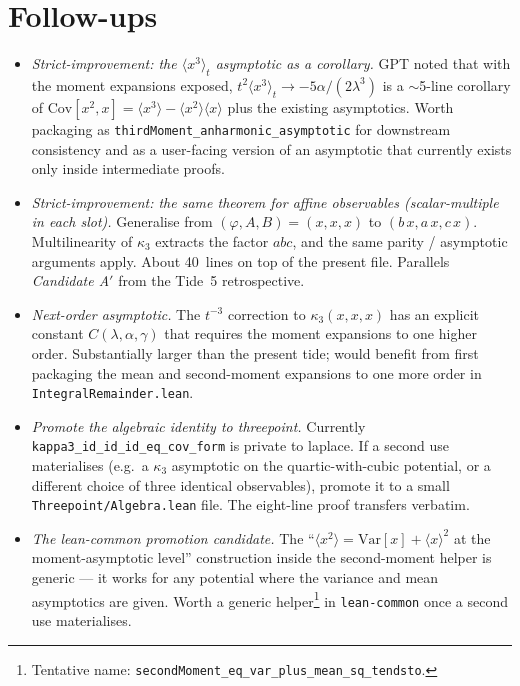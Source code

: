 \documentclass[11pt]{article}
\begin{document}
\section{Follow-ups}

\begin{itemize}
\item \emph{Strict-improvement: the $\langle x^3 \rangle_t$ asymptotic
as a corollary.} GPT noted that with the moment expansions exposed,
$t^2 \langle x^3 \rangle_t \to -5\alpha/(2\lambda^3)$ is a $\sim$5-line
corollary of $\mathrm{Cov}[x^2, x] = \langle x^3 \rangle - \langle x^2 \rangle \langle x \rangle$
plus the existing asymptotics. Worth packaging as
\texttt{thirdMoment\_anharmonic\_asymptotic} for downstream consistency
and as a user-facing version of an asymptotic that currently exists
only inside intermediate proofs.

\item \emph{Strict-improvement: the same theorem for affine observables
(scalar-multiple in each slot).} Generalise from $(\varphi, A, B) = (x, x, x)$
to $(b\,x, a\,x, c\,x)$. Multilinearity of $\kappa_3$ extracts the
factor $abc$, and the same parity / asymptotic arguments apply. About
40~lines on top of the present file. Parallels \emph{Candidate A$'$}
from the Tide~5 retrospective.

\item \emph{Next-order asymptotic.} The $t^{-3}$ correction to
$\kappa_3(x, x, x)$ has an explicit constant $C(\lambda, \alpha, \gamma)$
that requires the moment expansions to one higher order. Substantially
larger than the present tide; would benefit from first packaging the
mean and second-moment expansions to one more order in
\texttt{IntegralRemainder.lean}.

\item \emph{Promote the algebraic identity to threepoint.} Currently
\texttt{kappa3\_id\_id\_id\_eq\_cov\_form} is private to laplace. If a
second use materialises (e.g.\ a $\kappa_3$ asymptotic on the
quartic-with-cubic potential, or a different choice of three identical
observables), promote it to a small \texttt{Threepoint/Algebra.lean}
file. The eight-line proof transfers verbatim.

\item \emph{The lean-common promotion candidate.} The
``$\langle x^2 \rangle = \mathrm{Var}[x] + \langle x \rangle^2$ at the
moment-asymptotic level'' construction inside the second-moment helper
is generic --- it works for any potential where the variance and mean
asymptotics are given. Worth a generic helper\footnote{Tentative name:
\texttt{secondMoment\_eq\_var\_plus\_mean\_sq\_tendsto}.} in
\texttt{lean-common} once a second use materialises.


\end{itemize}
\end{document}
